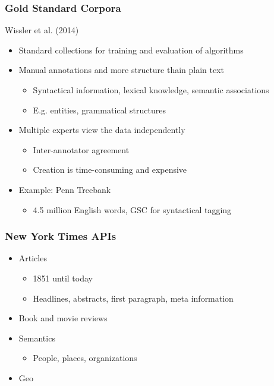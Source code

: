 \begin{frame}
    \frametitle{Gold Standard Corpora}
    \textcolor{iseblue}{Wissler et al. (2014)}
    \begin{itemize}
        \item Standard collections for training and evaluation of algorithms
        \item Manual annotations and more structure thain plain text
    \begin{itemize}
        \item Syntactical information, lexical knowledge, semantic associations
        \item E.g. entities, grammatical structures
    \end{itemize}
    \item Multiple experts view the data independently
    \begin{itemize}
        \item Inter-annotator agreement
        \item Creation is time-consuming and expensive
    \end{itemize}
    \item Example: Penn Treebank
    \begin{itemize}
        \item 4.5 million English words, GSC for syntactical tagging
    \end{itemize}
    \end{itemize}
\end{frame}

\begin{frame}
    \frametitle{New York Times APIs}
    \begin{itemize}
        \item Articles
    \begin{itemize}
        \item 1851 until today
        \item Headlines, abstracts, first paragraph, meta information
    \end{itemize}
    \item Book and movie reviews
    \item Semantics
    \begin{itemize}
        \item People, places, organizations
    \end{itemize}
    \item Geo
    \end{itemize}
\end{frame}


